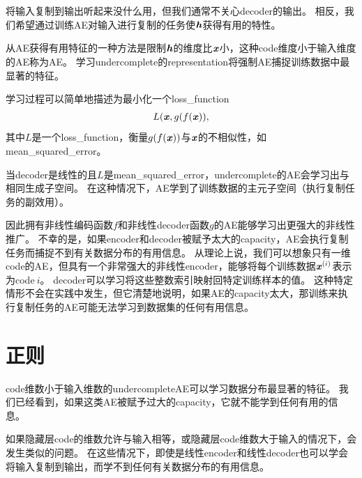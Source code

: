 
\section{}
\label{sec:undercomplete_autoencoders}
将输入复制到输出听起来没什么用，但我们通常不关心\gls{decoder}的输出。
相反，我们希望通过训练\gls{AE}对输入进行复制的任务使$\boldsymbol{\mathit{h}}$获得有用的特性。


从\gls{AE}获得有用特征的一种方法是限制$\boldsymbol{\mathit{h}}$的维度比$\boldsymbol{\mathit{x}}$小，这种\gls{code}维度小于输入维度的\gls{AE}称为\gls{AE}。
学习\gls{undercomplete}的\gls{representation}将强制\gls{AE}捕捉训练数据中最显著的特征。


学习过程可以简单地描述为最小化一个\gls{loss_function} 
\begin{align}
L(\boldsymbol{\mathit{x}}, g(f(\boldsymbol{\mathit{x}})),
\end{align}
其中$L$是一个\gls{loss_function}，衡量$g(f(\boldsymbol{\mathit{x}}))$与$\boldsymbol{\mathit{x}}$的不相似性，如\gls{mean_squared_error}。


当\gls{decoder}是线性的且$L$是\gls{mean_squared_error}，\gls{undercomplete}的\gls{AE}会学习出与相同生成子空间。
在这种情况下，\gls{AE}学到了训练数据的主元子空间（执行复制任务的副效用）。


因此拥有非线性编码函数$f$和非线性\gls{decoder}函数$g$的\gls{AE}能够学习出更强大的非线性推广。
不幸的是，如果\gls{encoder}和\gls{decoder}被赋予太大的\gls{capacity}，\gls{AE}会执行复制任务而捕捉不到有关数据分布的有用信息。
从理论上说，我们可以想象只有一维\gls{code}的\gls{AE}，但具有一个非常强大的非线性\gls{encoder}，能够将每个训练数据$\boldsymbol{\mathit{x}}^{(i)}$表示为\gls{code}$~i$。
\gls{decoder}可以学习将这些整数索引映射回特定训练样本的值。
这种特定情形不会在实践中发生，但它清楚地说明，如果\gls{AE}的\gls{capacity}太大，那训练来执行复制任务的\gls{AE}可能无法学习到数据集的任何有用信息。


\section{正则}
\label{sec:regularized_autoencoders}
\gls{code}维数小于输入维数的\gls{undercomplete}\gls{AE}可以学习数据分布最显著的特征。
我们已经看到，如果这类\gls{AE}被赋予过大的\gls{capacity}，它就不能学到任何有用的信息。


如果隐藏层\gls{code}的维数允许与输入相等，或隐藏层\gls{code}维数大于输入的情况下，会发生类似的问题。
在这些情况下，即使是线性\gls{encoder}和线性\gls{decoder}也可以学会将输入复制到输出，而学不到任何有关数据分布的有用信息。


